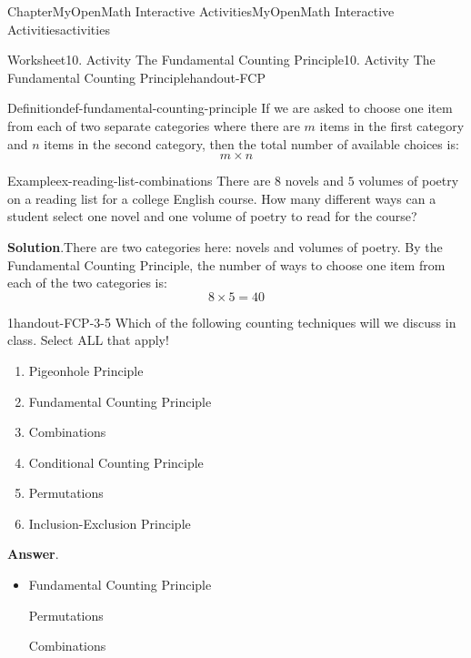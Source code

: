 \documentclass[oneside,10pt,]{book}
\newcommand{\blocktitlefont}{\relax}
\newcommand{\ptxlistdisc}{\raisebox{0.3ex}{\textbullet}}
\begin{document}
\begin{chapterptx}{Chapter}{MyOpenMath Interactive Activities}{}{MyOpenMath Interactive Activities}{}{}{activities}
\begin{worksheet-section}{Worksheet}{10. Activity The Fundamental Counting Principle}{}{10. Activity The Fundamental Counting Principle}{}{}{handout-FCP}
\begin{definition}{Definition}{}{def-fundamental-counting-principle}%
 If we are asked to choose one item from each of two separate categories where there are \(m\) items in the first category and \(n\) items in the second category, then the total number of available choices is:%
\begin{equation*}
m \times n
\end{equation*}
%
\end{definition}
\begin{example}{Example}{}{ex-reading-list-combinations}%
There are \(8\) novels and \(5\) volumes of poetry on a reading list for a college English course. How many different ways can a student select one novel and one volume of poetry to read for the course?%
\par\smallskip%
\noindent\textbf{\blocktitlefont Solution}.\hypertarget{ex-reading-list-combinations-2}{}\quad{}There are two categories here: novels and volumes of poetry. By the Fundamental Counting Principle, the number of ways to choose one item from each of the two categories is:%
\begin{equation*}
8 \times 5 = 40
\end{equation*}
%
\end{example}
\begin{divisionexercise}{1}{}{}{handout-FCP-3-5}%
Which of the following counting techniques will we discuss in class. Select ALL that apply!%
\par
%
\begin{enumerate}[label={(\alph*)}]
\item{}Pigeonhole Principle%
\item{}Fundamental Counting Principle%
\item{}Combinations%
\item{}Conditional Counting Principle%
\item{}Permutations%
\item{}Inclusion-Exclusion Principle%
\end{enumerate}
%
\par\smallskip%
\noindent\textbf{\blocktitlefont Answer}.\hypertarget{handout-FCP-3-5-2}{}\quad{}%
\begin{itemize}[label=\ptxlistdisc]
\item{}Fundamental Counting Principle%
\par
Permutations%
\par
Combinations%
\end{itemize}

\end{divisionexercise}
\end{worksheet-section}
\end{chapterptx}
\end{document}
